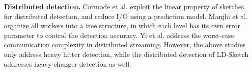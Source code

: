 {\bf Distributed detection.}
Cormode et al. \cite{Cormode2005b} exploit the linear property of sketches
for distributed detection, 
and reduce I/O using a prediction model. 
Manjhi et al. \cite{Manjhi2005}
organize all workers into a tree structure, in which each level has its own
error parameter to control the detection accuracy.
Yi et al. \cite{Yi2009} address the worst-case communication complexity in
distributed streaming.
However, the above studies only address heavy hitter detection, while the
distributed detection of LD-Sketch addresses heavy changer detection as well. 
